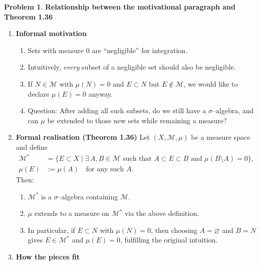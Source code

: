 \documentclass[12pt]{article}
\theoremstyle{definition} %
\newtheorem{problem}{Problem}
\theoremstyle{plain} %
\begin{document}
\pagebreak
\begin{problem}
  \textbf{Relationship between the motivational paragraph and Theorem 1.36}

  \begin{enumerate}

      \item \textbf{Informal motivation}  
            \begin{enumerate}
                \item Sets with measure $0$ are ``negligible'' for integration.
                \item Intuitively, \emph{every} subset of a negligible set should also be negligible.
                \item If $N\in\mathcal{M}$ with $\mu(N)=0$ and $E\subset N$ but $E\notin\mathcal{M}$, we would like to declare $\mu(E)=0$ anyway.
                \item Question: After adding all such subsets, do we still have a $\sigma$--algebra, and can $\mu$ be extended to those new sets while remaining a measure?
            \end{enumerate}

      \item \textbf{Formal realisation (Theorem 1.36)}  
            Let $(X,\mathcal{M},\mu)$ be a measure space and define
            \begin{align}
                \mathcal{M}^{*}
                &=
                \bigl\{E\subset X \;\big|\; \exists\,A,B\in\mathcal{M}\text{ such that }A\subset E\subset B
                     \text{ and }\mu(B\setminus A)=0\bigr\}, \\[6pt]
                \mu(E) &:= \mu(A)\quad\text{for any such }A .
            \end{align}
            Then:
            \begin{enumerate}
                \item $\mathcal{M}^{*}$ is a $\sigma$--algebra containing $\mathcal{M}$.
                \item $\mu$ extends to a measure on $\mathcal{M}^{*}$ via the above definition.
                \item In particular, if $E\subset N$ with $\mu(N)=0$, then choosing $A=\varnothing$ and $B=N$ gives $E\in\mathcal{M}^{*}$ and $\mu(E)=0$, fulfilling the original intuition.
            \end{enumerate}

      \item \textbf{How the pieces fit}  


\end{enumerate}
\end{problem}
\end{document}
